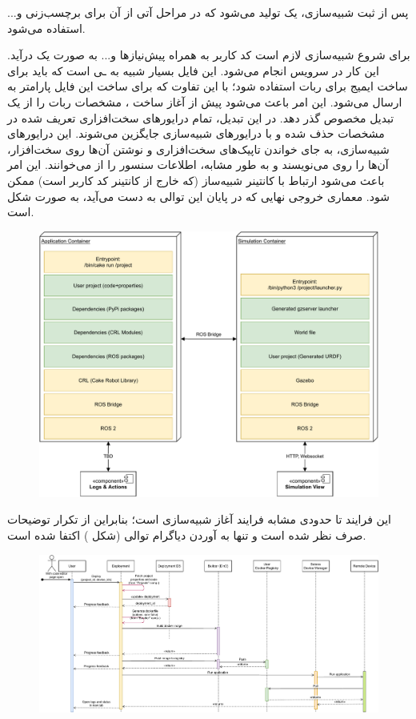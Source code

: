 \documentclass{cake-classes/short-report-fa}
\newcommand{\ورب}[1]{\lr{\Verb!#1!}}
\begin{document}
پس از ثبت شبیه‌سازی، یک  تولید می‌شود که در مراحل آتی از آن برای برچسب‌زنی و... استفاده می‌شود.

برای شروع شبیه‌سازی لازم است کد کاربر به همراه پیش‌نیازها و... به صورت یک  درآید. این کار در سرویس  انجام می‌شود. این فایل بسیار شبیه به ـی است که باید برای ساخت ایمیج برای ربات استفاده شود؛ با این تفاوت که برای ساخت این فایل پارامتر \ورب{sim=true} به  ارسال می‌شود. این امر باعث می‌شود  پیش از آغاز ساخت ، مشخصات ربات را از یک تبدیل مخصوص گذر دهد. در این تبدیل، تمام درایورهای سخت‌افزاری تعریف شده در مشخصات حذف شده و با درایورهای شبیه‌سازی جایگزین می‌شوند. این درایورهای شبیه‌سازی، به جای خواندن تاپیک‌های سخت‌افزاری  و نوشتن آن‌ها روی سخت‌افزار، آن‌ها را روی  می‌نویسند و به طور مشابه، اطلاعات سنسور را از  می‌خوانند. این امر باعث می‌شود ارتباط با کانتینر شبیه‌ساز (که خارج از کانتینر کد کاربر است) ممکن شود. معماری خروجی نهایی که در پایان این توالی به دست می‌آید، به صورت شکل  است.

\begin{figure}
	\centering
	\includegraphics[width=\linewidth]{img/sim-containers.pdf}
\end{figure}


این فرایند تا حدودی مشابه فرایند آغاز شبیه‌سازی است؛ بنابراین از تکرار توضیحات صرف نظر شده است و تنها به آوردن دیاگرام توالی (شکل ) اکتفا شده است.

\begin{landscape}
\begin{figure}
	\centering
	\includegraphics[width=\linewidth]{img/seq-push-to-robot.pdf}
\end{figure}
\end{landscape}
\end{document}
